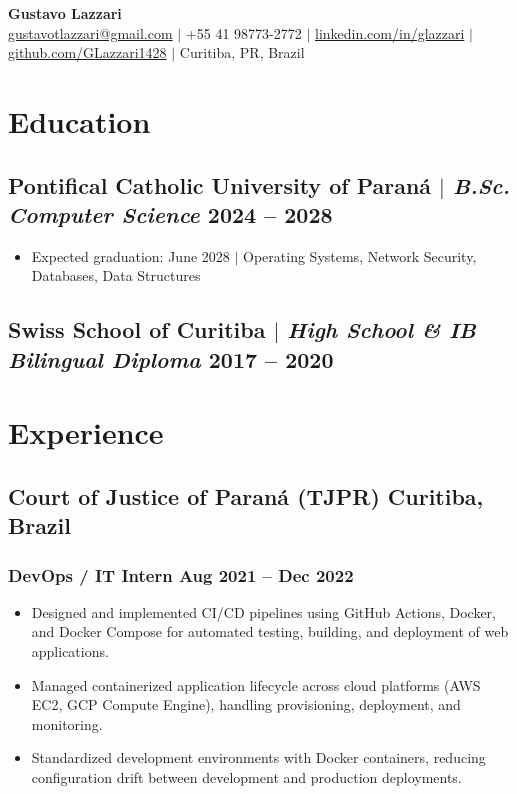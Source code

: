 \documentclass[10pt]{article}
\begin{document}
\begin{center}
	{\LARGE\bfseries Gustavo Lazzari} \\
	\vspace{2pt}
	\href{mailto:gustavotlazzari@gmail.com}{gustavotlazzari@gmail.com} $|$
	+55 41 98773-2772 $|$
	\href{https://www.linkedin.com/in/glazzari}{linkedin.com/in/glazzari} $|$
	\href{https://github.com/GLazzari1428}{github.com/GLazzari1428} $|$
	Curitiba, PR, Brazil
\end{center}

\section{Education}
\subsection{Pontifical Catholic University of Paran\'{a} $|$ {\normalfont\itshape B.Sc. Computer Science} \hfill 2024 -- 2028}
\begin{itemize}
	\item Expected graduation: June 2028 $|$ Operating Systems, Network Security, Databases, Data Structures
\end{itemize}
\subsection{Swiss School of Curitiba $|$ {\normalfont\itshape High School \& IB Bilingual Diploma} \hfill 2017 -- 2020}

\section{Experience}
\subsection{Court of Justice of Paran\'{a} (TJPR) \hfill Curitiba, Brazil}
\subsubsection{DevOps / IT Intern \hfill Aug 2021 -- Dec 2022}
\begin{itemize}
	\item Designed and implemented CI/CD pipelines using GitHub Actions, Docker, and Docker Compose for automated testing, building, and deployment of web applications.
	\item Managed containerized application lifecycle across cloud platforms (AWS EC2, GCP Compute Engine), handling provisioning, deployment, and monitoring.
	\item Standardized development environments with Docker containers, reducing configuration drift between development and production deployments.
\end{itemize}
\end{document}
